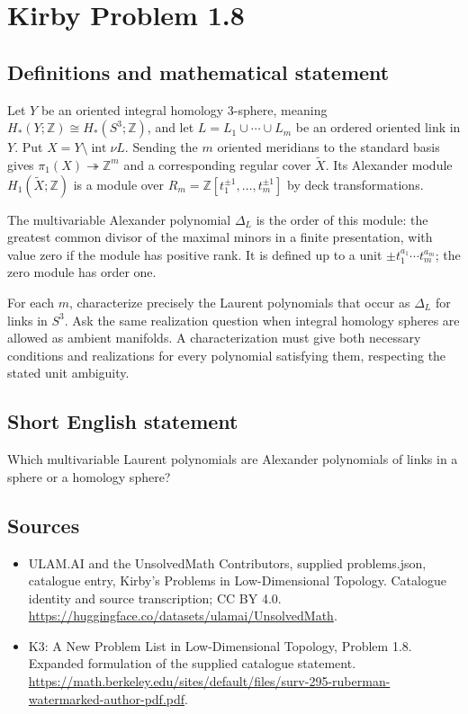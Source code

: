\documentclass[11pt,a4paper]{article}
\begin{document}
\section*{Kirby Problem 1.8}\label{statement}

\subsection{Definitions and mathematical statement}
Let $Y$ be an oriented integral homology $3$-sphere, meaning
$H_*(Y;\mathbb Z)\cong H_*(S^3;\mathbb Z)$, and let
$L=L_1\cup\cdots\cup L_m$ be an ordered oriented link in $Y$.
Put $X=Y\setminus\operatorname{int}\nu L$.
Sending the $m$ oriented meridians to the standard basis gives
$\pi_1(X)\twoheadrightarrow\mathbb Z^m$ and a corresponding regular cover
$\widetilde X$. Its Alexander module $H_1(\widetilde X;\mathbb Z)$ is a module over
$R_m=\mathbb Z[t_1^{\pm1},\ldots,t_m^{\pm1}]$ by deck transformations.

The multivariable Alexander polynomial $\Delta_L$ is the order of this module:
the greatest common divisor of the maximal minors in a finite presentation,
with value zero if the module has positive rank. It is defined up to a unit
$\pm t_1^{a_1}\cdots t_m^{a_m}$; the zero module has order one.

For each $m$, characterize precisely the Laurent polynomials that occur as
$\Delta_L$ for links in $S^3$. Ask the same realization question when integral
homology spheres are allowed as ambient manifolds. A characterization must give
both necessary conditions and realizations for every polynomial satisfying them,
respecting the stated unit ambiguity.
\subsection{Short English statement}
Which multivariable Laurent polynomials are Alexander polynomials of links in a sphere or a homology sphere?
\subsection{Sources}
\begin{itemize}
\item[S1] ULAM.AI and the UnsolvedMath Contributors, supplied problems.json, catalogue entry, Kirby's Problems in Low-Dimensional Topology. Catalogue identity and source transcription; CC BY 4.0.
\url{https://huggingface.co/datasets/ulamai/UnsolvedMath}.
\item[S2] K3: A New Problem List in Low-Dimensional Topology, Problem 1.8. Expanded formulation of the supplied catalogue statement.
\url{https://math.berkeley.edu/sites/default/files/surv-295-ruberman-watermarked-author-pdf.pdf}.
\end{itemize}
\end{document}
